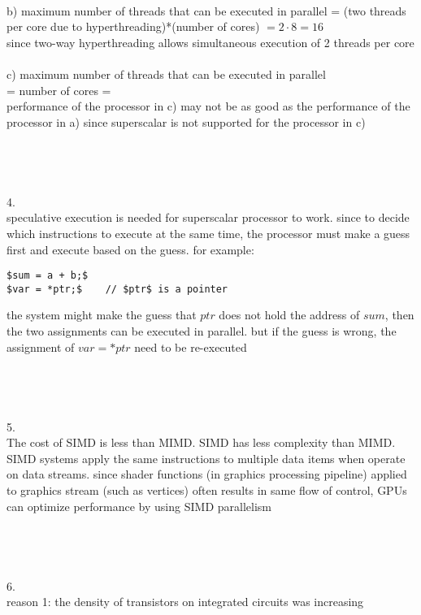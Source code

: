 \documentclass[12pt,border=4pt,multi]{article}%
\begin{document}
\\
b) maximum number of threads that can be executed in parallel = (two threads per core due to hyperthreading)*(number of cores) $= 2 \cdot 8 = \boxed{16}$\\
since two-way hyperthreading allows simultaneous execution of 2 threads per core\\
\\
c) maximum number of threads that can be executed in parallel\\
= number of cores = \\
performance of the processor in c) may not be as good as the performance of the processor in a) since superscalar is not supported for the processor in c)\\
\\
\\
\\
\\
4.\\
speculative execution is needed for superscalar processor to work. since to decide which instructions to execute at the same time, the processor must make a guess first and execute based on the guess. for example:
\begin{lstlisting}[mathescape = true]
$sum = a + b;$
$var = *ptr;$    // $ptr$ is a pointer
\end{lstlisting}
the system might make the guess that $ptr$ does not hold the address of $sum$, then the two assignments can be executed in parallel. but if the guess is wrong, the assignment of $var = *ptr$ need to be re-executed\\
\\
\\
\\
\\
5.\\
The cost of SIMD is less than MIMD. SIMD has less complexity than MIMD. SIMD systems apply the same instructions to multiple data items when operate on data streams. since shader functions (in graphics processing pipeline) applied to graphics stream (such as vertices) often results in same flow of control, GPUs can optimize performance by using SIMD parallelism\\
\\
\\
\\
\\
6.\\
reason 1: the density of transistors on integrated circuits was increasing\\
\end{document}

